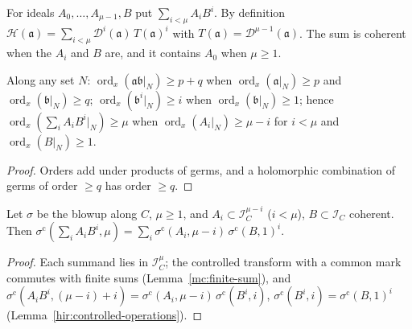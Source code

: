 \begin{definition}
\label{mc:hom-sum}
\leanok
For ideals \(A_0,\dots,A_{\mu-1},B\) put \(\sum_{i<\mu}A_iB^i\). By definition \(\mathcal H(\mathfrak a)=\sum_{i<\mu}\mathcal D^i(\mathfrak a)\,T(\mathfrak a)^i\) with
\(T(\mathfrak a)=\mathcal D^{\mu-1}(\mathfrak a)\). The sum is coherent when the \(A_i\) and \(B\) are, and it contains \(A_0\) when \(\mu\ge1\).
\end{definition}

\begin{lemma}
\label{mc:hom-sum-order}
\leanok
Along any set \(N\): \(\operatorname{ord}_x(\mathfrak a\mathfrak b|_N)\ge p+q\) when \(\operatorname{ord}_x(\mathfrak a|_N)\ge p\) and
\(\operatorname{ord}_x(\mathfrak b|_N)\ge q\); \(\operatorname{ord}_x(\mathfrak b^i|_N)\ge i\) when \(\operatorname{ord}_x(\mathfrak b|_N)\ge1\); hence
\(\operatorname{ord}_x(\sum_iA_iB^i|_N)\ge\mu\) when \(\operatorname{ord}_x(A_i|_N)\ge\mu-i\) for \(i<\mu\) and \(\operatorname{ord}_x(B|_N)\ge1\).
\end{lemma}
\begin{proof}
\leanok
Orders add under products of germs, and a holomorphic combination of germs of order \(\ge q\) has order \(\ge q\).
\end{proof}

\begin{lemma}
\label{mc:hom-sum-transform}
\leanok
Let \(\sigma\) be the blowup along \(C\), \(\mu\ge1\), and \(A_i\subset\mathcal I_C^{\mu-i}\) (\(i<\mu\)), \(B\subset\mathcal I_C\) coherent. Then
\(\sigma^{\mathrm c}(\sum_iA_iB^i,\mu)=\sum_i\sigma^{\mathrm c}(A_i,\mu-i)\,\sigma^{\mathrm c}(B,1)^i\).
\end{lemma}
\begin{proof}
\leanok
Each summand lies in \(\mathcal I_C^{\mu}\); the controlled transform with a common mark commutes with finite sums (Lemma~\ref{mc:finite-sum}), and
\(\sigma^{\mathrm c}(A_iB^i,(\mu-i)+i)=\sigma^{\mathrm c}(A_i,\mu-i)\,\sigma^{\mathrm c}(B^i,i)\), \(\sigma^{\mathrm c}(B^i,i)=\sigma^{\mathrm c}(B,1)^i\)
(Lemma~\ref{hir:controlled-operations}).
\end{proof}


